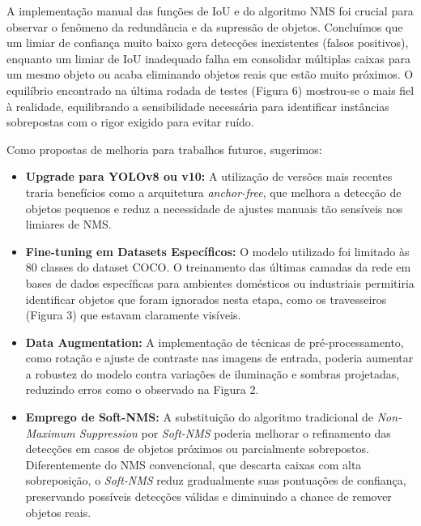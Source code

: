 \documentclass[conference]{IEEEtran}
\begin{document}
A implementação manual das funções de IoU e do algoritmo NMS foi crucial para observar o fenômeno da redundância e da supressão de objetos. Concluímos que um limiar de confiança muito baixo gera detecções inexistentes (falsos positivos), enquanto um limiar de IoU inadequado falha em consolidar múltiplas caixas para um mesmo objeto ou acaba eliminando objetos reais que estão muito próximos. O equilíbrio encontrado na última rodada de testes (Figura 6) mostrou-se o mais fiel à realidade, equilibrando a sensibilidade necessária para identificar instâncias sobrepostas com o rigor exigido para evitar ruído.

Como propostas de melhoria para trabalhos futuros, sugerimos:

\begin{itemize}
    \item \textbf{Upgrade para YOLOv8 ou v10:} A utilização de versões mais recentes traria benefícios como a arquitetura \textit{anchor-free}, que melhora a detecção de objetos pequenos e reduz a necessidade de ajustes manuais tão sensíveis nos limiares de NMS.
    \item \textbf{Fine-tuning em Datasets Específicos:} O modelo utilizado foi limitado às 80 classes do dataset COCO. O treinamento das últimas camadas da rede em bases de dados específicas para ambientes domésticos ou industriais permitiria identificar objetos que foram ignorados nesta etapa, como os travesseiros (Figura 3) que estavam claramente visíveis.
    \item \textbf{Data Augmentation:} A implementação de técnicas de pré-processamento, como rotação e ajuste de contraste nas imagens de entrada, poderia aumentar a robustez do modelo contra variações de iluminação e sombras projetadas, reduzindo erros como o observado na Figura 2.
    \item \textbf{Emprego de Soft-NMS:} A substituição do algoritmo tradicional de \textit{Non-Maximum Suppression} por \textit{Soft-NMS} poderia melhorar o refinamento das detecções em casos de objetos próximos ou parcialmente sobrepostos. Diferentemente do NMS convencional, que descarta caixas com alta sobreposição, o \textit{Soft-NMS} reduz gradualmente suas pontuações de confiança, preservando possíveis detecções válidas e diminuindo a chance de remover objetos reais\cite{bodla2017softnms}.

\end{itemize}



\end{document}
